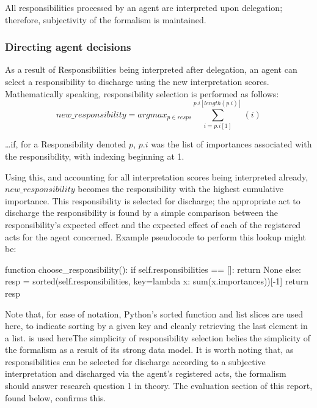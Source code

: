 All responsibilities processed by an agent are interpreted upon delegation; therefore, subjectivity of the formalism is maintained.\par

\subsubsection{Directing agent decisions}  %
As a result of Responsibilities being interpreted after delegation, an agent can select a responsibility to discharge using the new interpretation scores. Mathematically speaking, responsibility selection is performed as follows: \[new\_responsibility = argmax_{p \in resps} {\sum_{i=p.i[1]}^{p.i[length(p.i)]}(i)}\]

\ldots{}if, for a Responsibility denoted \(p\), \(p.i\) was the list of importances associated with the responsibility, with indexing beginning at 1.\par

Using this, and accounting for all interpretation scores being interpreted already, \(new\_responsibility\) becomes the responsibility with the highest cumulative importance. This responsibility is selected for discharge; the appropriate act to discharge the responsibility is found by a simple comparison between the responsibility's expected effect and the expected effect of each of the registered acts for the agent concerned. Example pseudocode to perform this lookup might be:

\begin{pseudocodelisting}
function choose_responsibility():
    if self.responsibilities == []:
        return None
    else:
        resp = sorted(self.responsibilities,
                      key=lambda x: sum(x.importances))[-1]
        return resp
\end{pseudocodelisting}

Note that, for ease of notation, Python's sorted function and list slices are used here, to indicate sorting by a given key and cleanly retrieving the last element in a list. is used hereThe simplicity of responsibility selection belies the simplicity of the formalism as a result of its strong data model. It is worth noting that, as responsibilities can be selected for discharge according to a subjective interpretation and discharged via the agent's registered acts, the formalism should answer research question 1 in theory. The evaluation section of this report, found below, confirms this.\par

